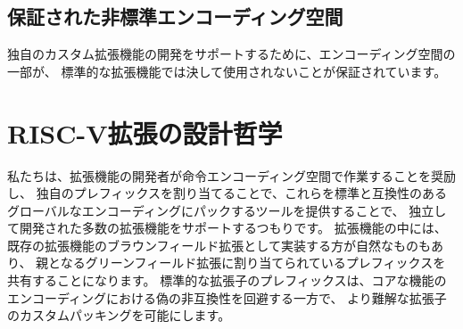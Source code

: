 \vspace{-0.2in}
\begin{comment}
\subsection*{Guaranteed Non-Standard Encoding Space}
\end{comment}
\subsection*{保証された非標準エンコーディング空間}

\begin{comment}
To support development of proprietary custom extensions, portions of
the encoding space are guaranteed to never be used by standard
extensions.
\end{comment}
独自のカスタム拡張機能の開発をサポートするために、エンコーディング空間の一部が、
標準的な拡張機能では決して使用されないことが保証されています。

\begin{comment}
\section{RISC-V Extension Design Philosophy}
\end{comment}
\section{RISC-V拡張の設計哲学}

\begin{comment}
We intend to support a large number of independently developed
extensions by encouraging extension developers to operate within
instruction encoding spaces, and by providing tools to pack these into
a standard-compatible global encoding by allocating unique prefixes.
Some extensions are more naturally implemented as brownfield
augmentations of existing extensions, and will share whatever prefix
is allocated to their parent greenfield extension.  The standard
extension prefixes avoid spurious incompatibilities in the encoding of
core functionality, while allowing custom packing of more esoteric
extensions.
\end{comment}
私たちは、拡張機能の開発者が命令エンコーディング空間で作業することを奨励し、
独自のプレフィックスを割り当てることで、これらを標準と互換性のあるグローバルなエンコーディングにパックするツールを提供することで、
独立して開発された多数の拡張機能をサポートするつもりです。
拡張機能の中には、既存の拡張機能のブラウンフィールド拡張として実装する方が自然なものもあり、
親となるグリーンフィールド拡張に割り当てられているプレフィックスを共有することになります。
標準的な拡張子のプレフィックスは、コアな機能のエンコーディングにおける偽の非互換性を回避する一方で、
より難解な拡張子のカスタムパッキングを可能にします。

